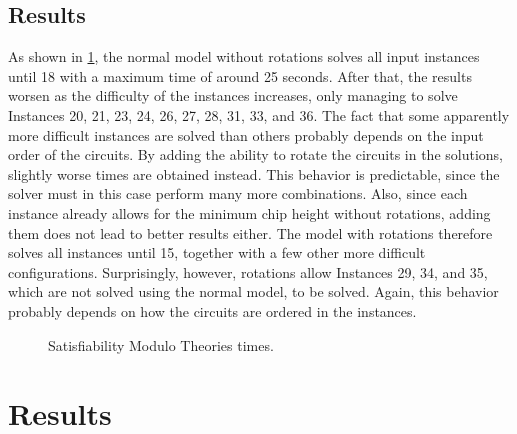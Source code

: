 \documentclass[a4paper, 12pt]{article}
\begin{document}
\subsection{Results}

As shown in \cref{fig:smt}, the normal model without rotations solves all input instances until 18 with a maximum time of around 25 seconds. After that, the results worsen as the difficulty of the instances increases, only managing to solve Instances 20, 21, 23, 24, 26, 27, 28, 31, 33, and 36. The fact that some apparently more difficult instances are solved than others probably depends on the input order of the circuits. By adding the ability to rotate the circuits in the solutions, slightly worse times are obtained instead. This behavior is predictable, since the solver must in this case perform many more combinations. Also, since each instance already allows for the minimum chip height without rotations, adding them does not lead to better results either. The model with rotations therefore solves all instances until 15, together with a few other more difficult configurations. Surprisingly, however, rotations allow Instances 29, 34, and 35, which are not solved using the normal model, to be solved. Again, this behavior probably depends on how the circuits are ordered in the instances.

\begin{figure}
    \centering
    \caption{Satisfiability Modulo Theories times.}
    \label{fig:smt}
\end{figure}


\clearpage


\section{Results}
\end{document}
